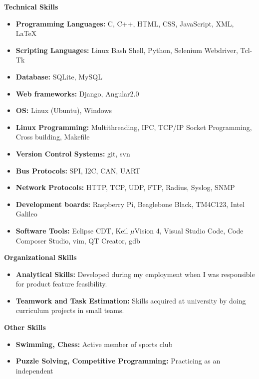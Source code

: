 \documentclass[letterpaper,10pt]{article}
\newcommand{\resheading}[1]{{\large \colorbox{mygrey}{\begin{minipage}{\textwidth}{\textbf{#1 \vphantom{p\^{E}}}}\end{minipage}}}}
\begin{document}
\resheading{Technical Skills}
\begin{itemize}
\item \textbf{Programming Languages:} C, C++, HTML, CSS, JavaScript, XML, LaTeX
\item \textbf{Scripting Languages:} Linux Bash Shell, Python, Selenium Webdriver, Tcl-Tk
\item \textbf{Database:} SQLite, MySQL
\item \textbf{Web frameworks:} Django, Angular2.0
\item \textbf{OS:} Linux (Ubuntu), Windows
\item \textbf{Linux Programming:} Multithreading, IPC, TCP/IP Socket Programming, Cross building, Makefile
\item \textbf{Version Control Systems:} git, svn
\item \textbf{Bus Protocols:} SPI, I2C, CAN, UART
\item \textbf{Network Protocols:} HTTP, TCP, UDP, FTP, Radius, Syslog, SNMP
\item \textbf{Development boards:} Raspberry Pi, Beaglebone Black, TM4C123, Intel Galileo
\item \textbf{Software Tools:} Eclipse CDT, Keil $\mu$Vision 4, Visual Studio Code, Code Composer Studio, vim, QT Creator, gdb

\end{itemize}

\resheading{Organizational Skills}
\begin{itemize}
\item \textbf{Analytical Skills:} Developed during my employment when I was responsible for product feature feasibility.
\item \textbf{Teamwork and Task Estimation:} Skills acquired at university by doing curriculum projects in small teams.

\end{itemize}

\resheading{Other Skills}
    \begin{itemize}
        \item \textbf{Swimming, Chess:} Active member of sports club
        \item \textbf{Puzzle Solving, Competitive Programming:} Practicing as an independent
    \end{itemize}
\end{document}
